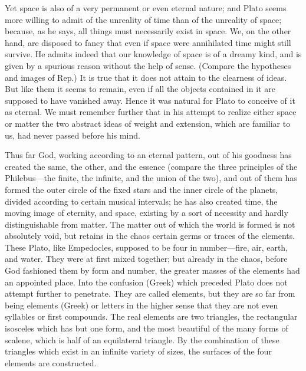 \documentclass[11pt,letter]{article}
\begin{document}
\par  Yet space is also of a very permanent or even eternal nature; and Plato seems more willing to admit of the unreality of time than of the unreality of space; because, as he says, all things must necessarily exist in space. We, on the other hand, are disposed to fancy that even if space were annihilated time might still survive. He admits indeed that our knowledge of space is of a dreamy kind, and is given by a spurious reason without the help of sense. (Compare the hypotheses and images of Rep.) It is true that it does not attain to the clearness of ideas. But like them it seems to remain, even if all the objects contained in it are supposed to have vanished away. Hence it was natural for Plato to conceive of it as eternal. We must remember further that in his attempt to realize either space or matter the two abstract ideas of weight and extension, which are familiar to us, had never passed before his mind.

\par  Thus far God, working according to an eternal pattern, out of his goodness has created the same, the other, and the essence (compare the three principles of the Philebus—the finite, the infinite, and the union of the two), and out of them has formed the outer circle of the fixed stars and the inner circle of the planets, divided according to certain musical intervals; he has also created time, the moving image of eternity, and space, existing by a sort of necessity and hardly distinguishable from matter. The matter out of which the world is formed is not absolutely void, but retains in the chaos certain germs or traces of the elements. These Plato, like Empedocles, supposed to be four in number—fire, air, earth, and water. They were at first mixed together; but already in the chaos, before God fashioned them by form and number, the greater masses of the elements had an appointed place. Into the confusion (Greek) which preceded Plato does not attempt further to penetrate. They are called elements, but they are so far from being elements (Greek) or letters in the higher sense that they are not even syllables or first compounds. The real elements are two triangles, the rectangular isosceles which has but one form, and the most beautiful of the many forms of scalene, which is half of an equilateral triangle. By the combination of these triangles which exist in an infinite variety of sizes, the surfaces of the four elements are constructed.
\end{document}
